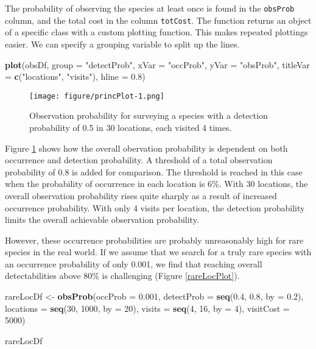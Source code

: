 \documentclass[]{article}
\newenvironment{Shaded}{\begin{snugshade}}{\end{snugshade}}
\newcommand{\KeywordTok}[1]{\textcolor[rgb]{0.13,0.29,0.53}{\textbf{#1}}}
\newcommand{\DataTypeTok}[1]{\textcolor[rgb]{0.13,0.29,0.53}{#1}}
\newcommand{\DecValTok}[1]{\textcolor[rgb]{0.00,0.00,0.81}{#1}}
\newcommand{\FloatTok}[1]{\textcolor[rgb]{0.00,0.00,0.81}{#1}}
\newcommand{\StringTok}[1]{\textcolor[rgb]{0.31,0.60,0.02}{#1}}
\newcommand{\NormalTok}[1]{#1}
\begin{document}
The probability of observing the species at least once is found in the
\texttt{obsProb} column, and the total cost in the column
\texttt{totCost}. The function returns an object of a specific class
with a custom plotting function. This makes repeated plottings easier.
We can specify a grouping variable to split up the lines.

\begin{Shaded}
\begin{Highlighting}[]
\KeywordTok{plot}\NormalTok{(obsDf, }\DataTypeTok{group =} \StringTok{"detectProb"}\NormalTok{, }\DataTypeTok{xVar =} \StringTok{"occProb"}\NormalTok{, }\DataTypeTok{yVar =} \StringTok{"obsProb"}\NormalTok{, }\DataTypeTok{titleVar =} \KeywordTok{c}\NormalTok{(}\StringTok{"locations"}\NormalTok{, }
    \StringTok{"visits"}\NormalTok{), }\DataTypeTok{hline =} \FloatTok{0.8}\NormalTok{)}
\end{Highlighting}
\end{Shaded}

\begin{figure}
\centering
\texttt{[image: figure/princPlot-1.png]}
\caption{Observation probability for surveying a species with a
detection probability of 0.5 in 30 locations, each visited 4 times.
\label{princPlot}}
\end{figure}

Figure \ref{princPlot} shows how the overall obervation probability is
dependent on both occurrence and detection probability. A threshold of a
total observation probability of 0.8 is added for comparison. The
threshold is reached in this case when the probability of occurrence in
each location is 6\%. With 30 locations, the overall observation
probability rises quite sharply as a result of increased occurrence
probability. With only 4 visits per location, the detection probability
limits the overall achievable observation probability.

However, these occurrence probabilities are probably unreasonably high
for rare species in the real world. If we assume that we search for a
truly rare species with an occurrence probability of only 0.001, we find
that reaching overall detectabilities above 80\% is challenging (Figure
\ref{rareLocPlot}).

\begin{Shaded}
\begin{Highlighting}[]
\NormalTok{rareLocDf <-}\StringTok{ }\KeywordTok{obsProb}\NormalTok{(}\DataTypeTok{occProb =} \FloatTok{0.001}\NormalTok{, }\DataTypeTok{detectProb =} \KeywordTok{seq}\NormalTok{(}\FloatTok{0.4}\NormalTok{, }\FloatTok{0.8}\NormalTok{, }\DataTypeTok{by =} \FloatTok{0.2}\NormalTok{), }
    \DataTypeTok{locations =} \KeywordTok{seq}\NormalTok{(}\DecValTok{30}\NormalTok{, }\DecValTok{1000}\NormalTok{, }\DataTypeTok{by =} \DecValTok{20}\NormalTok{), }\DataTypeTok{visits =} \KeywordTok{seq}\NormalTok{(}\DecValTok{4}\NormalTok{, }\DecValTok{16}\NormalTok{, }\DataTypeTok{by =} \DecValTok{4}\NormalTok{), }\DataTypeTok{visitCost =} \DecValTok{5000}\NormalTok{)}

\NormalTok{rareLocDf}
\end{Highlighting}
\end{Shaded}
\end{document}
